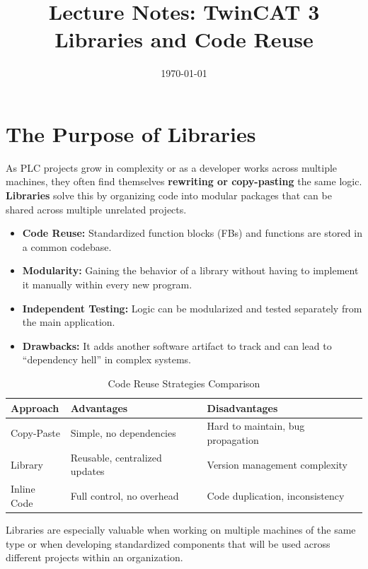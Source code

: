 \documentclass[11pt,a4paper]{article}
\title{
    \vspace{-1cm}
    \textbf{Lecture Notes: TwinCAT 3}\\
    \Large Libraries and Code Reuse
}
\author{}
\date{\today}
\begin{document}
\maketitle

\tableofcontents
\newpage

\section{The Purpose of Libraries}

As PLC projects grow in complexity or as a developer works across multiple machines, they often find themselves \textbf{rewriting or copy-pasting} the same logic. \textbf{Libraries} solve this by organizing code into modular packages that can be shared across multiple unrelated projects.

\begin{itemize}[leftmargin=*]
    \item \textbf{Code Reuse:} Standardized function blocks (FBs) and functions are stored in a common codebase.
    \item \textbf{Modularity:} Gaining the behavior of a library without having to implement it manually within every new program.
    \item \textbf{Independent Testing:} Logic can be modularized and tested separately from the main application.
    \item \textbf{Drawbacks:} It adds another software artifact to track and can lead to ``dependency hell'' in complex systems.
\end{itemize}

\begin{table}[h]
\centering
\begin{tabular}{@{}lll@{}}
\toprule
\textbf{Approach} & \textbf{Advantages} & \textbf{Disadvantages} \\
\midrule
Copy-Paste & Simple, no dependencies & Hard to maintain, bug propagation \\
Library & Reusable, centralized updates & Version management complexity \\
Inline Code & Full control, no overhead & Code duplication, inconsistency \\
\bottomrule
\end{tabular}
\caption{Code Reuse Strategies Comparison}
\end{table}

\begin{notebox}
Libraries are especially valuable when working on multiple machines of the same type or when developing standardized components that will be used across different projects within an organization.
\end{notebox}
\end{document}

